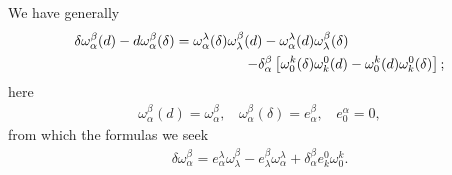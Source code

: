 We have generally
\begin{eqnarray*}
\lefteqn{
\delta \omega^\beta_\alpha (d) - d \omega^\beta_\alpha (\delta)
= \omega^\lambda_\alpha (\delta) \omega^\beta_\lambda (d) 
- \omega^\lambda_\alpha (d) \omega^\beta_\lambda (\delta)
 } \\ && \hspace*{4cm}
 - \delta^\beta_\alpha \left[ \omega^k_0 (\delta) \omega^0_k (d) 
- \omega^k_0 (d) \omega^0_k (\delta) \right] ;
\end{eqnarray*}
here
\begin{eqnarray*}
\omega^\beta_\alpha (d) = \omega^\beta_\alpha, \ \ \ \ 
\omega^\beta_\alpha (\delta) = e^\beta_\alpha, \ \ \ \ 
e^\alpha_0  = 0 ,
 \end{eqnarray*}
from which the formulas we seek
\begin{eqnarray}
\delta \omega^\beta_\alpha = e^\lambda_\alpha \omega^\beta_\lambda - e^\beta_\lambda \omega^\lambda_\alpha + \delta^\beta_\alpha e^0_k \omega^k_0 .
\label{eq:3-5}
\end{eqnarray}






































































